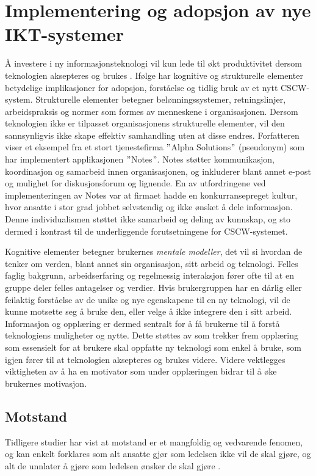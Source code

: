 \section{Implementering og adopsjon av nye IKT-systemer}
\label{sec:implementering}
 
Å investere i ny informasjonsteknologi vil kun lede til økt produktivitet dersom teknologien aksepteres og brukes \citep{Venkatesh99}.
Ifølge \citet{Orlikowski92} har kognitive og strukturelle elementer betydelige implikasjoner for adopsjon, forståelse og tidlig bruk av et nytt CSCW-system. Strukturelle elementer betegner belønningssystemer, retningslinjer, arbeidspraksis og normer som formes av menneskene i organisasjonen. Dersom teknologien ikke er tilpasset organisasjonens strukturelle elementer, vil den sannsynligvis ikke skape effektiv samhandling uten at disse endres. Forfatteren viser et eksempel fra et stort tjenestefirma $"$Alpha Solutions$"$ (pseudonym) som har implementert applikasjonen $"$Notes$"$. Notes støtter kommunikasjon, koordinasjon og samarbeid innen organisasjonen, og inkluderer blant annet e-post og mulighet for diskusjonsforum og lignende. En av utfordringene ved implementeringen av Notes var at firmaet hadde en konkurransepreget kultur, hvor ansatte i stor grad jobbet selvstendig og ikke ønsket å dele informasjon. Denne individualismen støttet ikke samarbeid og deling av kunnskap, og sto dermed i kontrast til de underliggende forutsetningene for CSCW-systemet.
 
\noindent
Kognitive elementer betegner brukernes \textit{mentale modeller}, det vil si hvordan de tenker om verden, blant annet sin organisasjon, sitt arbeid og teknologi. Felles faglig bakgrunn, arbeidserfaring og regelmessig interaksjon fører ofte til at en gruppe deler felles antagelser og verdier. Hvis brukergruppen har en dårlig eller feilaktig forståelse av de unike og nye egenskapene til en ny teknologi, vil de kunne motsette seg å bruke den, eller velge å ikke integrere den i sitt arbeid. Informasjon og opplæring er dermed sentralt for å få brukerne til å forstå teknologiens muligheter og nytte. Dette støttes av \citet{Venkatesh99} som trekker frem opplæring som essensielt for at brukere skal oppfatte ny teknologi som enkel å bruke, som igjen fører til at teknologien aksepteres og brukes videre. Videre vektlegges viktigheten av å ha en motivator som under opplæringen bidrar til å øke brukernes motivasjon.
 
\subsection{Motstand}
\label{sec:motstand}
Tidligere studier har vist at motstand er et mangfoldig og vedvarende fenomen, og kan enkelt forklares som alt ansatte gjør som ledelsen ikke vil de skal gjøre, og alt de unnlater å gjøre som ledelsen ønsker de skal gjøre \citep{Timmons03}.
 
